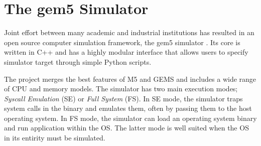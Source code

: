 \section{The gem5 Simulator}

Joint effort between many academic and industrial institutions has resulted in
an open source computer simulation framework, the gem5 simulator \cite{gem5}.
Its core is written in C++ and has a highly modular interface that allows users
to specify simulator target through simple Python scripts.

The project merges the best features of M5 \cite{M5} and GEMS \cite{GEMS} and
includes a wide range of CPU and memory models. The simulator has two main
execution modes; \textit{Syscall Emulation} (SE) or \textit{Full System} (FS).
In SE mode, the simulator traps system calls in the binary and emulates them,
often by passing them to the host operating system. In FS mode, the simulator
can load an operating system binary and run application within the OS. The
latter mode is well suited when the OS in its entirity must be simulated.
